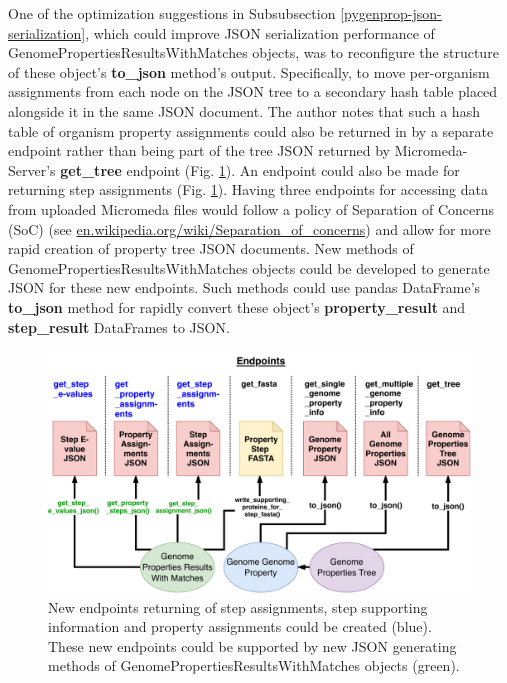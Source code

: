 One of the optimization suggestions in Subsubsection \ref{pygenprop-json-serialization}, which could improve JSON serialization performance of GenomePropertiesResultsWithMatches objects, was to reconfigure the structure of these object's \textbf{to\_json} method's output. Specifically, to move per-organism assignments from each node on the JSON tree to a secondary hash table placed alongside it in the same JSON document. The author notes that such a hash table of organism property assignments could also be returned in by a separate endpoint rather than being part of the tree JSON returned by Micromeda-Server's \textbf{get\_tree} endpoint (Fig. \ref{fig:new_endpoints}). An endpoint could also be made for returning step assignments (Fig. \ref{fig:new_endpoints}). Having three endpoints for accessing data from uploaded Micromeda files would follow a policy of Separation of Concerns (SoC) (see \href{en.wikipedia.org/wiki/Separation\_of\_concerns}{en.wikipedia.org/wiki/Separation\_of\_concerns}) and allow for more rapid creation of property tree JSON documents. New methods of  GenomePropertiesResultsWithMatches objects could be developed to generate JSON for these new endpoints. Such methods could use pandas DataFrame's \textbf{to\_json} method for rapidly convert these object's \textbf{property\_result} and \textbf{step\_result} DataFrames to JSON.

\begin{figure}[!ht]
  \centering
	\includegraphics[width=\textwidth]{media/micromeda-server-new-endpoints.pdf}
	 \caption{New endpoints returning of step assignments, step supporting information and property assignments could be created (blue). These new endpoints could be supported by new JSON generating methods of GenomePropertiesResultsWithMatches objects (green).}
	 \label{fig:new_endpoints}
\end{figure}

